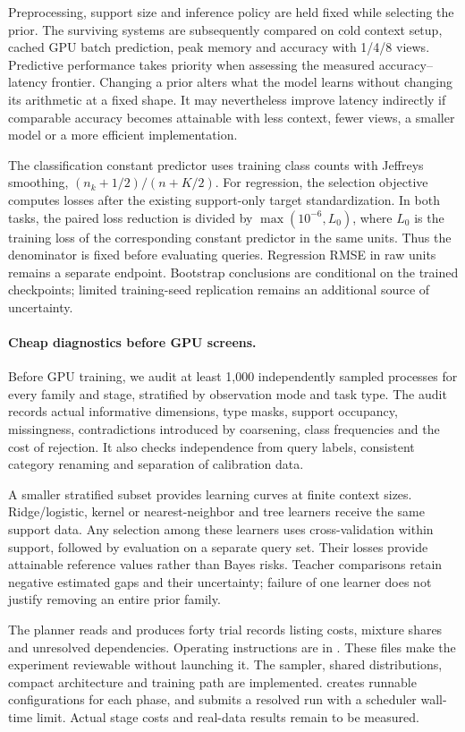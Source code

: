 \documentclass[11pt]{article}
\begin{document}
Preprocessing, support size and inference policy are held fixed while selecting the prior. The surviving systems are subsequently compared on cold context setup, cached GPU batch prediction, peak memory and accuracy with 1/4/8 views. Predictive performance takes priority when assessing the measured accuracy--latency frontier. Changing a prior alters what the model learns without changing its arithmetic at a fixed shape. It may nevertheless improve latency indirectly if comparable accuracy becomes attainable with less context, fewer views, a smaller model or a more efficient implementation.

The classification constant predictor uses training class counts with Jeffreys smoothing, $(n_k+1/2)/(n+K/2)$. For regression, the selection objective computes losses after the existing support-only target standardization. In both tasks, the paired loss reduction is divided by $\max(10^{-6},L_0)$, where $L_0$ is the training loss of the corresponding constant predictor in the same units. Thus the denominator is fixed before evaluating queries. Regression RMSE in raw units remains a separate endpoint. Bootstrap conclusions are conditional on the trained checkpoints; limited training-seed replication remains an additional source of uncertainty.

\paragraph{Cheap diagnostics before GPU screens.}
Before GPU training, we audit at least 1,000 independently sampled processes for every family and stage, stratified by observation mode and task type. The audit records actual informative dimensions, type masks, support occupancy, missingness, contradictions introduced by coarsening, class frequencies and the cost of rejection. It also checks independence from query labels, consistent category renaming and separation of calibration data.

A smaller stratified subset provides learning curves at finite context sizes. Ridge/logistic, kernel or nearest-neighbor and tree learners receive the same support data. Any selection among these learners uses cross-validation within support, followed by evaluation on a separate query set. Their losses provide attainable reference values rather than Bayes risks. Teacher comparisons retain negative estimated gaps and their uncertainty; failure of one learner does not justify removing an entire prior family.

The planner  reads  and produces forty trial records listing costs, mixture shares and unresolved dependencies. Operating instructions are in . These files make the experiment reviewable without launching it. The sampler, shared distributions, compact architecture and training path are implemented.  creates runnable configurations for each phase, and  submits a resolved run with a scheduler wall-time limit. Actual stage costs and real-data results remain to be measured.
\end{document}
